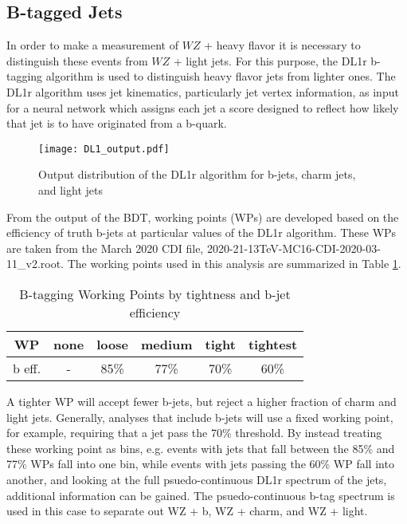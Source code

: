 \subsection{B-tagged Jets}
\label{subsec:bjets}

In order to make a measurement of $WZ$ + heavy flavor it is necessary to distinguish these events from $WZ$ + light jets. For this purpose, the DL1r b-tagging algorithm is used to distinguish heavy flavor jets from lighter ones. The DL1r algorithm uses jet kinematics, particularly jet vertex information, as input for a neural network which assigns each jet a score designed to reflect how likely that jet is to have originated from a b-quark. 

\begin{figure}[H] 
    \centering
    \texttt{[image: DL1\_output.pdf]} 
    \caption{Output distribution of the DL1r algorithm for b-jets, charm jets, and light jets}
    \label{fig:DL1r}
\end{figure}

From the output of the BDT, working points (WPs) are developed based on the efficiency of truth b-jets at particular values of the DL1r algorithm. These WPs are taken from the March 2020 CDI file, 2020-21-13TeV-MC16-CDI-2020-03-11\_v2.root. The working points used in this analysis are summarized in Table \ref{tab:btag_WPs}. 

\begin{table}[H] 
\begin{center}
\begin{tabular}{|c|ccccc|}
    \hline
       WP &  none & loose & medium & tight & tightest\\
       \hline
     b eff. & - & 85\% & 77\% & 70\% & 60\% \\ 
    \hline
    \end{tabular}    
    \caption{B-tagging Working Points by tightness and b-jet efficiency}
    \label{tab:btag_WPs}
    \end{center}
\end{table}

A tighter WP will accept fewer b-jets, but reject a higher fraction of charm and light jets. Generally, analyses that include b-jets will use a fixed working point, for example, requiring that a jet pass the 70\% threshold. By instead treating these working point as bins, e.g. events with jets that fall between the 85\% and 77\% WPs fall into one bin, while events with jets passing the 60\% WP fall into another, and looking at the full psuedo-continuous DL1r spectrum of the jets, additional information can be gained. The psuedo-continuous b-tag spectrum is used in this case to separate out WZ + b, WZ + charm, and WZ + light. 

